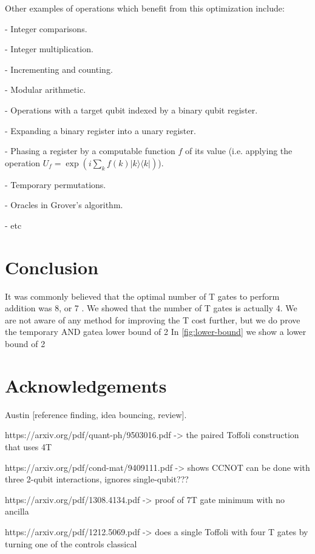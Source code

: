 \documentclass[twocolumn,longbibliography]{quantumarticle-customized}
\begin{document}
Other examples of operations which benefit from this optimization include:

- Integer comparisons.

- Integer multiplication.

- Incrementing and counting.

- Modular arithmetic.

- Operations with a target qubit indexed by a binary qubit register.

- Expanding a binary register into a unary register.

- Phasing a register by a computable function $f$ of its value (i.e. applying the operation $U_f = \exp\left( i \sum_k f(k) |k\rangle \langle k| \right)$).

- Temporary permutations.

- Oracles in Grover's algorithm.

- etc


\section{Conclusion}
\label{sec:conclusion}

It was commonly believed that the optimal number of T gates to perform addition was 8, or 7 \cite{AustinDiscussionsAndEmails2017}.
We showed that the number of T gates is actually 4.
We are not aware of any method for improving the T cost further, but we do prove the temporary AND gatea lower bound of 2 In \autoref{fig:lower-bound} we show a lower bound of 2


\section{Acknowledgements}

Austin [reference finding, idea bouncing, review].





https://arxiv.org/pdf/quant-ph/9503016.pdf   ->   the paired Toffoli construction that uses 4T

https://arxiv.org/pdf/cond-mat/9409111.pdf   -> shows CCNOT can be done with three 2-qubit interactions, ignores single-qubit???


https://arxiv.org/pdf/1308.4134.pdf -> proof of 7T gate minimum with no ancilla

https://arxiv.org/pdf/1212.5069.pdf  ->   does a single Toffoli with four T gates by turning one of the controls classical
\end{document}
